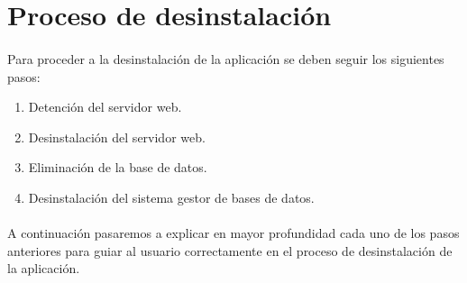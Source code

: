 \section{Proceso de desinstalación}

  \paragraph{}Para proceder a la desinstalación de la aplicación se deben seguir
  los siguientes pasos:

  \begin{enumerate}
   \item Detención del servidor web.
   \item Desinstalación del servidor web.
   \item Eliminación de la base de datos.
   \item Desinstalación del sistema gestor de bases de datos.
  \end{enumerate}

  \paragraph{}A continuación pasaremos a explicar en mayor profundidad cada
  uno de los pasos anteriores para guiar al usuario correctamente en el proceso
  de desinstalación de la aplicación.

  \begin{enumerate}
    
    
    
    
%     
  \end{enumerate}

